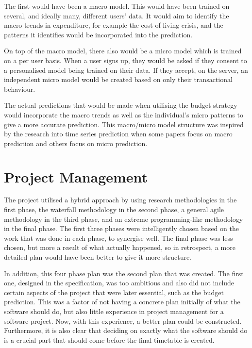 The first would have been a macro model. This would have been trained on several, and ideally many, different users' data. It would aim to identify the macro trends in expenditure, for example the cost of living crisis, and the patterns it identifies would be incorporated into the prediction.

On top of the macro model, there also would be a micro model which is trained on a per user basis. When a user signs up, they would be asked if they consent to a personalised model being trained on their data. If they accept, on the server, an independent micro model would be created based on only their transactional behaviour.

The actual predictions that would be made when utilising the budget strategy would incorporate the macro trends as well as the individual's micro patterns to give a more accurate prediction. This macro/micro model structure was inspired by the research into time series prediction when some papers focus on macro prediction and others focus on micro prediction.

\section{Project Management}
The project utilised a hybrid approach by using research methodologies in the first phase, the waterfall methodology in the second phase, a general agile methodology in the third phase, and an extreme programming-like methodology in the final phase. The first three phases were intelligently chosen based on the work that was done in each phase, to synergise well. The final phase was less chosen, but more a result of what actually happened, so in retrospect, a more detailed plan would have been better to give it more structure.

In addition, this four phase plan was the second plan that was created. The first one, designed in the specification, was too ambitious and also did not include certain aspects of the project that were later essential, such as the budget prediction. This was a factor of not having a concrete plan initially of what the software should do, but also little experience in project management for a software project. Now, with this experience, a better plan could be constructed. Furthermore, it is also clear that deciding on exactly what the software should do is a crucial part that should come before the final timetable is created.